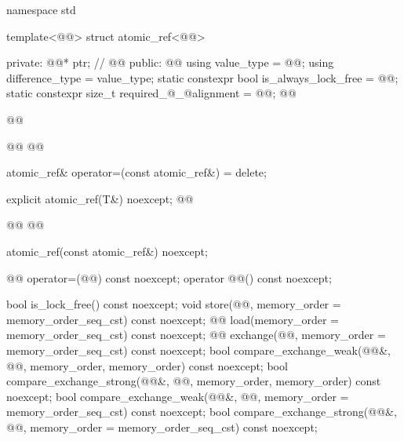 \begin{codeblock}
namespace std {
  template<@@> struct atomic_ref<@@> {
  private:
    @@* ptr; // \expos
    @@
  public:
    @@
    using value_type = @@;
    using difference_type = value_type;
    static constexpr bool is_always_lock_free = @@;
    static constexpr size_t required_@_@alignment = @@;
    @@
    
    @@

    @@
    @@

    atomic_ref& operator=(const atomic_ref&) = delete;

    explicit atomic_ref(T&) noexcept;
    @@
    
    @@
    @@
    
    atomic_ref(const atomic_ref&) noexcept;

    @@ operator=(@@) const noexcept;
    operator @@() const noexcept;

    bool is_lock_free() const noexcept;
    void store(@@, memory_order = memory_order_seq_cst) const noexcept;
    @@ load(memory_order = memory_order_seq_cst) const noexcept;
    @@ exchange(@@,
                      memory_order = memory_order_seq_cst) const noexcept;
    bool compare_exchange_weak(@@&, @@,
                               memory_order, memory_order) const noexcept;
    bool compare_exchange_strong(@@&, @@,
                                 memory_order, memory_order) const noexcept;
    bool compare_exchange_weak(@@&, @@,
                               memory_order = memory_order_seq_cst) const noexcept;
    bool compare_exchange_strong(@@&, @@,
                                 memory_order = memory_order_seq_cst) const noexcept;

}}
\end{codeblock}
